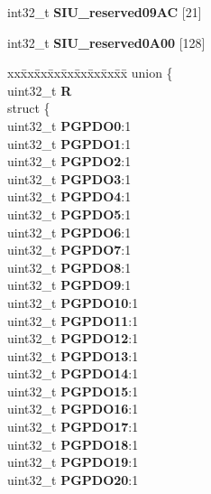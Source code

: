 \begin{DoxyCompactItemize}
\begin{tabbing}
\end{tabbing}\item 
\mbox{\label{structSIU__tag_aa575bd93014f858ca87cb01f83db559b}} 
int32\+\_\+t {\bfseries S\+I\+U\+\_\+reserved09\+AC} \mbox{[}21\mbox{]}
\item 
\mbox{\label{structSIU__tag_aec0ada06a086bba67e1b5b4bf5f3cc84}} 
int32\+\_\+t {\bfseries S\+I\+U\+\_\+reserved0\+A00} \mbox{[}128\mbox{]}
\item 
\mbox{\label{structSIU__tag_a583df4046886fecb9ed6f93f3031479f}} 
\begin{tabbing}
xx\=xx\=xx\=xx\=xx\=xx\=xx\=xx\=xx\=\kill
union \{\\
\>uint32\_t {\bfseries R}\\
\>struct \{\\
\>\>uint32\_t {\bfseries PGPDO0}:1\\
\>\>uint32\_t {\bfseries PGPDO1}:1\\
\>\>uint32\_t {\bfseries PGPDO2}:1\\
\>\>uint32\_t {\bfseries PGPDO3}:1\\
\>\>uint32\_t {\bfseries PGPDO4}:1\\
\>\>uint32\_t {\bfseries PGPDO5}:1\\
\>\>uint32\_t {\bfseries PGPDO6}:1\\
\>\>uint32\_t {\bfseries PGPDO7}:1\\
\>\>uint32\_t {\bfseries PGPDO8}:1\\
\>\>uint32\_t {\bfseries PGPDO9}:1\\
\>\>uint32\_t {\bfseries PGPDO10}:1\\
\>\>uint32\_t {\bfseries PGPDO11}:1\\
\>\>uint32\_t {\bfseries PGPDO12}:1\\
\>\>uint32\_t {\bfseries PGPDO13}:1\\
\>\>uint32\_t {\bfseries PGPDO14}:1\\
\>\>uint32\_t {\bfseries PGPDO15}:1\\
\>\>uint32\_t {\bfseries PGPDO16}:1\\
\>\>uint32\_t {\bfseries PGPDO17}:1\\
\>\>uint32\_t {\bfseries PGPDO18}:1\\
\>\>uint32\_t {\bfseries PGPDO19}:1\\
\>\>uint32\_t {\bfseries PGPDO20}:1\\

\end{tabbing}
\end{DoxyCompactItemize}
